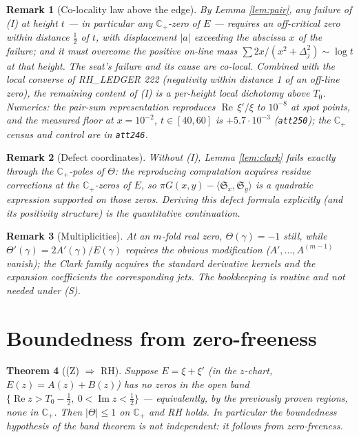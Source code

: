 \documentclass[11pt]{article}
\newtheorem{theorem}{Theorem}
\newtheorem{remark}[theorem]{Remark}
\newcommand{\C}{\mathbb{C}}
\newcommand{\Hp}{\C_{+}}
\newcommand{\Th}{\Theta}
\newcommand{\Sfr}{\mathfrak{S}}
\begin{document}
\begin{remark}[Co-locality law above the edge]
By Lemma \ref{lem:pair}, any failure of (I) at height $t$ --- in particular
any $\Hp$-zero of $E$ --- requires an off-critical zero within distance
$\tfrac12$ of $t$, with displacement $|a|$ exceeding the abscissa $x$ of the
failure; and it must overcome the positive on-line mass
$\sum 2x/(x^2+\Delta_j^2)\sim\log t$ at that height. The seat's failure and
its cause are co-local. Combined with the local converse of RH\_LEDGER 222
(negativity within distance 1 of an off-line zero), the remaining content of
(I) is a per-height local dichotomy above $T_0$. Numerics: the pair-sum
representation reproduces $\operatorname{Re}\,\xi'/\xi$ to $10^{-8}$ at spot
points, and the measured floor at $x=10^{-2}$, $t\in[40,60]$ is
$+5.7\cdot10^{-3}$ (\texttt{att250}); the $\Hp$ census and control are in
\texttt{att246}.
\end{remark}

\begin{remark}[Defect coordinates]\label{rem:defect}
Without (I), Lemma \ref{lem:clark} fails exactly through the $\Hp$-poles of
$\Th$: the reproducing computation acquires residue corrections at the
$\Hp$-zeros of $E$, so
$\pi G(x,y)-\langle\Sfr_x,\Sfr_y\rangle$ is a quadratic expression supported on
those zeros. Deriving this defect formula explicitly (and its positivity
structure) is the quantitative continuation.
\end{remark}

\begin{remark}[Multiplicities]\label{rem:mult}
At an $m$-fold real zero, $\Th(\gamma)=-1$ still, while
$\Th'(\gamma)=2A'(\gamma)/E(\gamma)$ requires the obvious modification
($A',\dots,A^{(m-1)}$ vanish); the Clark family acquires the standard
derivative kernels and the expansion coefficients the corresponding jets. The
bookkeeping is routine and not needed under (S).
\end{remark}

\section{Boundedness from zero-freeness}

\begin{theorem}[(Z) $\Rightarrow$ RH]\label{thm:ZtoRH}
Suppose $E=\xi+\xi'$ (in the $z$-chart, $E(z)=A(z)+B(z)$) has no zeros in the
open band $\{\operatorname{Re}z>T_0-\tfrac12,\ 0<\operatorname{Im}z<\tfrac12\}$
--- equivalently, by the previously proven regions, none in $\Hp$. Then
$|\Th|\le1$ on $\Hp$ and RH holds. In particular the boundedness hypothesis of
the band theorem is not independent: it follows from zero-freeness.
\end{theorem}
\end{document}
